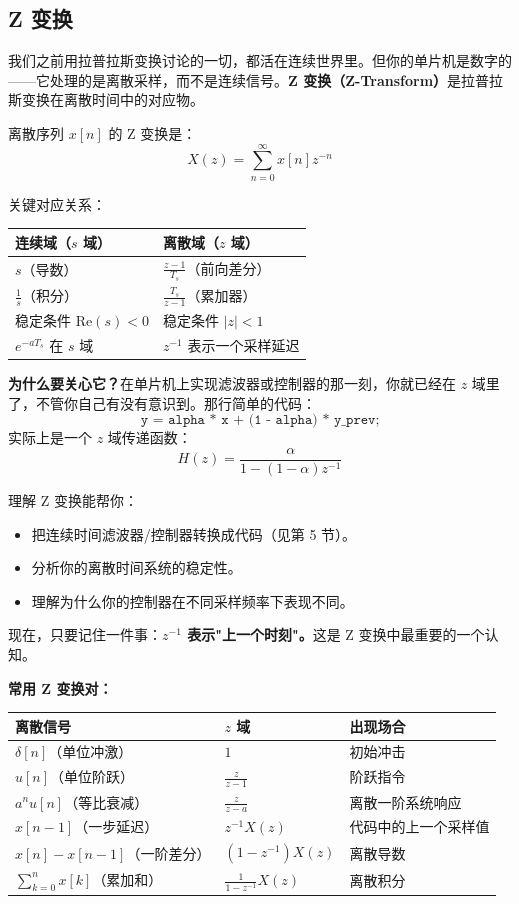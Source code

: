 \subsection{Z 变换}

我们之前用拉普拉斯变换讨论的一切，都活在连续世界里。但你的单片机是数字的——它处理的是离散采样，而不是连续信号。\textbf{Z 变换（Z-Transform）}是拉普拉斯变换在离散时间中的对应物。

离散序列 $x[n]$ 的 Z 变换是：
\begin{equation}
X(z) = \sum_{n=0}^{\infty} x[n] z^{-n}
\end{equation}

关键对应关系：
\begin{center}
\begin{tabular}{ll}
\toprule
\textbf{连续域（$s$ 域）} & \textbf{离散域（$z$ 域）} \\
\midrule
$s$（导数） & $\frac{z-1}{T_s}$（前向差分） \\
$\frac{1}{s}$（积分） & $\frac{T_s}{z-1}$（累加器） \\
稳定条件 $\text{Re}(s) < 0$ & 稳定条件 $|z| < 1$ \\
$e^{-aT_s}$ 在 $s$ 域 & $z^{-1}$ 表示一个采样延迟 \\
\bottomrule
\end{tabular}
\end{center}

\textbf{为什么要关心它？}在单片机上实现滤波器或控制器的那一刻，你就已经在 $z$ 域里了，不管你自己有没有意识到。那行简单的代码：
\[
\texttt{y = alpha * x + (1 - alpha) * y\_prev;}
\]
实际上是一个 $z$ 域传递函数：
\[
H(z) = \frac{\alpha}{1 - (1-\alpha)z^{-1}}
\]

理解 Z 变换能帮你：
\begin{itemize}
    \item 把连续时间滤波器/控制器转换成代码（见第 5 节）。
    \item 分析你的离散时间系统的稳定性。
    \item 理解为什么你的控制器在不同采样频率下表现不同。
\end{itemize}

现在，只要记住一件事：\textbf{$z^{-1}$ 表示"上一个时刻"。}这是 Z 变换中最重要的一个认知。

\textbf{常用 Z 变换对：}

\begin{center}
\begin{tabular}{lll}
\toprule
\textbf{离散信号} & \textbf{$z$ 域} & \textbf{出现场合} \\
\midrule
$\delta[n]$（单位冲激） & $1$ & 初始冲击 \\
$u[n]$（单位阶跃） & $\frac{z}{z-1}$ & 阶跃指令 \\
$a^n u[n]$（等比衰减） & $\frac{z}{z-a}$ & 离散一阶系统响应 \\
$x[n-1]$（一步延迟） & $z^{-1}X(z)$ & 代码中的上一个采样值 \\
$x[n] - x[n-1]$（一阶差分） & $(1 - z^{-1})X(z)$ & 离散导数 \\
$\sum_{k=0}^{n} x[k]$（累加和） & $\frac{1}{1 - z^{-1}}X(z)$ & 离散积分 \\
\bottomrule
\end{tabular}
\end{center}

